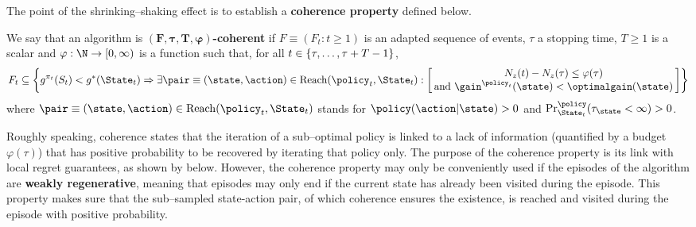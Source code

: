 \documentclass[preprint,cleveref,12pt]{colt2025}
\DeclarePairedDelimiter{\braces}{\{}{\}}	%
\DeclarePairedDelimiter{\brackets}{[}{]}	%
\def\optgain{\optimalgain} %
\def\Reach{\mathrm{Reach}}
\newcommand{\strong}[1]{\textbf{#1}}
\begin{document}
    The point of the shrinking--shaking effect is to establish a \strong{coherence property} defined below. 
    
    \begin{definition}[Coherence]
        \label{definition_coherence}
        We say that an algorithm is \strong{$\boldsymbol{(F, \tau, T, \varphi)}$-coherent} if $F \equiv (F_t : t \ge 1)$ is an adapted sequence of events, $\tau$ a stopping time, $T \ge 1$ is a scalar and $\varphi : \N \to [0, \infty)$ is a function such that, for all $t \in \braces{\tau, \ldots, \tau + T - 1}$, 
        \begin{equation*}
            F_t 
            \subseteq 
            \braces*{
                g^{\pi_t}(S_t) < g^*(\State_t)
                \Rightarrow
                \exists \pair \equiv (\state,\action) \in \Reach(\policy_t, \State_t) 
                :
                \brackets*{
                    \hspace{-.3em}
                    \begin{array}{c}
                        N_z(t) - N_z(\tau) \le \varphi(\tau)
                        \\
                        \text{and~}
                        \gain^{\policy_t}(\state) < \optgain(\state)
                    \end{array}
                    \hspace{-.3em}
                }
            }
        \end{equation*}
        where $\pair\equiv(\state,\action) \in \Reach(\policy_t, \State_t)$ stands for $\policy(\action|\state) > 0$ and $\Pr^\policy_{\State_t}(\tau_{\state}<\infty) > 0$.  
    \end{definition}

    Roughly speaking, coherence states that the iteration of a sub--optimal policy is linked to a lack of information (quantified by a budget $\varphi(\tau)$) that has positive probability to be recovered by iterating that policy only. 
    The purpose of the coherence property is its link with local regret guarantees, as shown by  below.
    However, the coherence property may only be conveniently used if the episodes of the algorithm are \strong{weakly regenerative}, meaning that episodes may only end if the current state has already been visited during the episode. 
    This property makes sure that the sub--sampled state-action pair, of which coherence ensures the existence, is reached and visited during the episode with positive probability.
\end{document}
